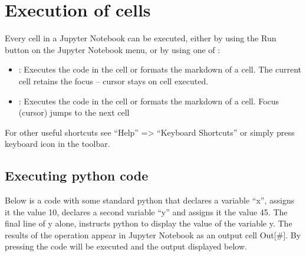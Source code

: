 \documentclass[letterpaper,10pt,english]{jupyterBook}
\begin{document}
\section{Execution of cells}
\label{\detokenize{content/04_PythonEssentials/Intro_Jupyter_notebook:execution-of-cells}}
\sphinxAtStartPar
Every cell in a Jupyter Notebook can be executed, either by using the Run button on the Jupyter Notebook menu, or by using one of :
\begin{itemize}
\item {} 
\sphinxAtStartPar
{}: Executes the code in the cell or formats the markdown of a cell.  The current cell retains the focus – cursor stays on cell executed.

\item {} 
\sphinxAtStartPar
{}: Executes the code in the cell or formats the markdown of a cell. Focus (cursor) jumps to the next cell

\end{itemize}

\sphinxAtStartPar
For other useful shortcuts see “Help” => “Keyboard Shortcuts” or simply press keyboard icon in the toolbar.


\subsection{Executing python code}
\label{\detokenize{content/04_PythonEssentials/Intro_Jupyter_notebook:executing-python-code}}
\sphinxAtStartPar
Below is a code with some standard python that declares a variable “x”, assigns it the value 10, declares a second variable “y” and assigns it the value 45.  The final line of y alone, instructs python to display the value of the variable y.  The results of the operation appear in Jupyter Notebook as an output cell Out{[}\#{]}.  By pressing  the code will be executed and the output displayed below.
\end{document}
